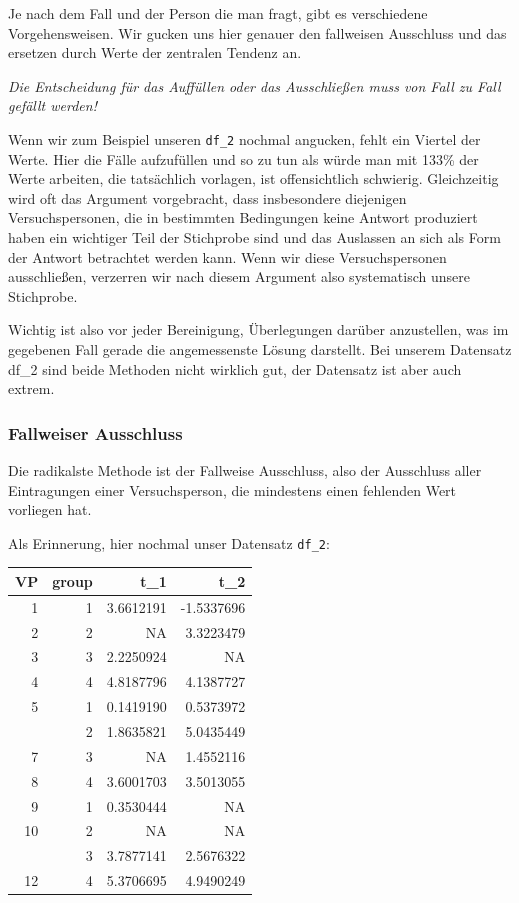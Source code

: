 \documentclass[
]{book}
\begin{document}
Je nach dem Fall und der Person die man fragt, gibt es verschiedene Vorgehensweisen. Wir gucken uns hier genauer den fallweisen Ausschluss und das ersetzen durch Werte der zentralen Tendenz an.

\emph{Die Entscheidung für das Auffüllen oder das Ausschließen muss von Fall zu Fall gefällt werden!}

Wenn wir zum Beispiel unseren \texttt{df\_2} nochmal angucken, fehlt ein Viertel der Werte.
Hier die Fälle aufzufüllen und so zu tun als würde man mit 133\% der Werte arbeiten, die tatsächlich vorlagen, ist offensichtlich schwierig.
Gleichzeitig wird oft das Argument vorgebracht, dass insbesondere diejenigen Versuchspersonen, die in bestimmten Bedingungen keine Antwort produziert haben ein wichtiger Teil der Stichprobe sind und das Auslassen an sich als Form der Antwort betrachtet werden kann.
Wenn wir diese Versuchspersonen ausschließen, verzerren wir nach diesem Argument also systematisch unsere Stichprobe.

Wichtig ist also vor jeder Bereinigung, Überlegungen darüber anzustellen, was im gegebenen Fall gerade die angemessenste Lösung darstellt.
Bei unserem Datensatz df\_2 sind beide Methoden nicht wirklich gut, der Datensatz ist aber auch extrem.

\hypertarget{fallweiser-ausschluss}{%
\subsubsection{Fallweiser Ausschluss}\label{fallweiser-ausschluss}}

Die radikalste Methode ist der Fallweise Ausschluss, also der Ausschluss aller Eintragungen einer Versuchsperson, die mindestens einen fehlenden Wert vorliegen hat.

Als Erinnerung, hier nochmal unser Datensatz \texttt{df\_2}:

\begin{tabular}[t]{rrrr}
\toprule
VP & group & t\_1 & t\_2\\
\midrule
1 & 1 & 3.6612191 & -1.5337696\\
2 & 2 & NA & 3.3223479\\
3 & 3 & 2.2250924 & NA\\
4 & 4 & 4.8187796 & 4.1387727\\
5 & 1 & 0.1419190 & 0.5373972\\
\addlinespace
6 & 2 & 1.8635821 & 5.0435449\\
7 & 3 & NA & 1.4552116\\
8 & 4 & 3.6001703 & 3.5013055\\
9 & 1 & 0.3530444 & NA\\
10 & 2 & NA & NA\\
\addlinespace
11 & 3 & 3.7877141 & 2.5676322\\
12 & 4 & 5.3706695 & 4.9490249\\
\bottomrule
\end{tabular}
\end{document}
